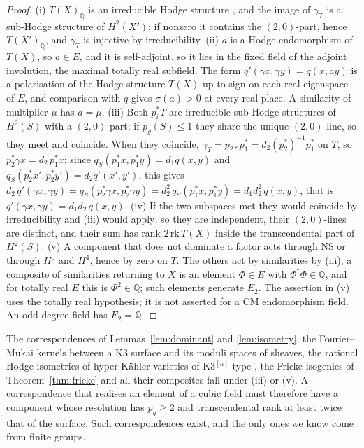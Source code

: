\documentclass[11pt,reqno]{amsart}
\numberwithin{equation}{section}
\theoremstyle{plain}
\theoremstyle{definition}
\newcommand{\QQ}{\mathbb{Q}}
\newcommand{\NS}{\mathrm{NS}}
\begin{document}
\begin{proof}
(i) $T(X)_{\QQ}$ is an irreducible Hodge structure \cite{Zar83}, and the image of $\gamma_{T}$ is a sub-Hodge structure of $H^{2}(X')$; if nonzero it contains the $(2,0)$-part, hence $T(X')_{\QQ}$, and $\gamma_{T}$ is injective by irreducibility. (ii) $a$ is a Hodge endomorphism of $T(X)$, so $a\in E$, and it is self-adjoint, so it lies in the fixed field of the adjoint involution, the maximal totally real subfield. The form $q'(\gamma x,\gamma y)=q(x,ay)$ is a polarisation of the Hodge structure $T(X)$ up to sign on each real eigenspace of $E$, and comparison with $q$ gives $\sigma(a)>0$ at every real place. A similarity of multiplier $\mu$ has $a=\mu$. (iii) Both $p_{i}^{*}T$ are irreducible sub-Hodge structures of $H^{2}(S)$ with a $(2,0)$-part; if $p_{g}(S)\le1$ they share the unique $(2,0)$-line, so they meet and coincide. When they coincide, $\gamma_{T}=p_{2*}p_{1}^{*}=d_{2}(p_{2}^{*})^{-1}p_{1}^{*}$ on $T$, so $p_{2}^{*}\gamma x=d_{2}\,p_{1}^{*}x$; since $q_{S}(p_{1}^{*}x,p_{1}^{*}y)=d_{1}q(x,y)$ and $q_{S}(p_{2}^{*}x',p_{2}^{*}y')=d_{2}q'(x',y')$, this gives $d_{2}\,q'(\gamma x,\gamma y)=q_{S}(p_{2}^{*}\gamma x,p_{2}^{*}\gamma y)=d_{2}^{2}\,q_{S}(p_{1}^{*}x,p_{1}^{*}y)=d_{1}d_{2}^{2}\,q(x,y)$, that is $q'(\gamma x,\gamma y)=d_{1}d_{2}\,q(x,y)$. (iv) If the two subspaces met they would coincide by irreducibility and (iii) would apply; so they are independent, their $(2,0)$-lines are distinct, and their sum has rank $2\,\mathrm{rk}\,T(X)$ inside the transcendental part of $H^{2}(S)$. (v) A component that does not dominate a factor acts through $\NS$ or through $H^{0}$ and $H^{4}$, hence by zero on $T$. The others act by similarities by (iii), a composite of similarities returning to $X$ is an element $\Phi\in E$ with $\Phi^{\dagger}\Phi\in\QQ$, and for totally real $E$ this is $\Phi^{2}\in\QQ$; such elements generate $E_{2}$. The assertion in (v) uses the totally real hypothesis; it is not asserted for a CM endomorphism field. An odd-degree field has $E_{2}=\QQ$.
\end{proof}

The correspondences of Lemmas~\ref{lem:dominant} and \ref{lem:isometry}, the Fourier--Mukai kernels between a K3 surface and its moduli spaces of sheaves, the rational Hodge isometries of hyper-K\"ahler varieties of K3$^{[n]}$ type \cite{Mar24}, the Fricke isogenies of Theorem~\ref{thm:fricke} and all their composites fall under (iii) or (v). A correspondence that realises an element of a cubic field must therefore have a component whose resolution has $p_{g}\ge2$ and transcendental rank at least twice that of the surface. Such correspondences exist, and the only ones we know come from finite groups.
\end{document}
